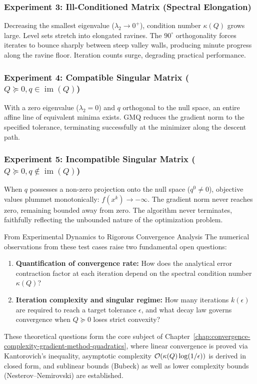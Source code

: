 \subsubsection{Experiment 3: Ill-Conditioned Matrix (Spectral Elongation)}
Decreasing the smallest eigenvalue ($\lambda_2 \to 0^+$), condition number $\kappa(Q)$ grows large. Level sets stretch into elongated ravines.
The $90^\circ$ orthogonality forces iterates to bounce sharply between steep valley walls, producing minute progress along the ravine floor. Iteration counts surge, degrading practical performance.

\subsubsection{Experiment 4: Compatible Singular Matrix ($Q \succeq 0, q \in \operatorname{im}(Q)$)}
With a zero eigenvalue ($\lambda_2 = 0$) and $q$ orthogonal to the null space, an entire affine line of equivalent minima exists. GMQ reduces the gradient norm to the specified tolerance, terminating successfully at the minimizer along the descent path.

\subsubsection{Experiment 5: Incompatible Singular Matrix ($Q \succeq 0, q \notin \operatorname{im}(Q)$)}
When $q$ possesses a non-zero projection onto the null space ($q^0 \neq 0$), objective values plummet monotonically: $f(x^k) \to -\infty$. The gradient norm never reaches zero, remaining bounded away from zero. The algorithm never terminates, faithfully reflecting the unbounded nature of the optimization problem.

\begin{noteblock}{From Experimental Dynamics to Rigorous Convergence Analysis}
The numerical observations from these test cases raise two fundamental open questions:
\begin{enumerate}
    \item \textbf{Quantification of convergence rate:} How does the analytical error contraction factor at each iteration depend on the spectral condition number $\kappa(Q)$?
    \item \textbf{Iteration complexity and singular regime:} How many iterations $k(\epsilon)$ are required to reach a target tolerance $\epsilon$, and what decay law governs convergence when $Q \succeq 0$ loses strict convexity?
\end{enumerate}
These theoretical questions form the core subject of Chapter~\ref{chap:convergence-complexity-gradient-method-quadratics}, where linear convergence is proved via Kantorovich's inequality, asymptotic complexity $\mathcal{O}\!\left(\kappa(Q) \log(1/\epsilon)\right)$ is derived in closed form, and sublinear bounds (Bubeck) as well as lower complexity bounds (Nesterov--Nemirovski) are established.
\end{noteblock}

